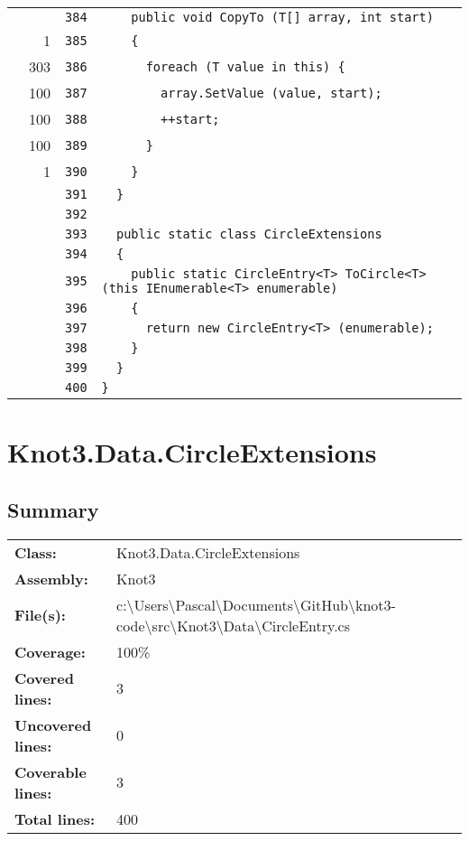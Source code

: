 \documentclass[a4paper,10pt]{article}
\begin{document}
\begin{longtable}[l]{lrrl}
\cellcolor{gray} &  & \verb~384~ & \verb~    public void CopyTo (T[] array, int start)~\\
\cellcolor{green} & 1 & \verb~385~ & \verb~    {~\\
\cellcolor{green} & 303 & \verb~386~ & \verb~      foreach (T value in this) {~\\
\cellcolor{green} & 100 & \verb~387~ & \verb~        array.SetValue (value, start);~\\
\cellcolor{green} & 100 & \verb~388~ & \verb~        ++start;~\\
\cellcolor{green} & 100 & \verb~389~ & \verb~      }~\\
\cellcolor{green} & 1 & \verb~390~ & \verb~    }~\\
\cellcolor{gray} &  & \verb~391~ & \verb~  }~\\
\cellcolor{gray} &  & \verb~392~ & \verb~~\\
\cellcolor{gray} &  & \verb~393~ & \verb~  public static class CircleExtensions~\\
\cellcolor{gray} &  & \verb~394~ & \verb~  {~\\
\cellcolor{gray} &  & \verb~395~ & \verb~    public static CircleEntry<T> ToCircle<T> (this IEnumerable<T> enumerable)~\\
\cellcolor{gray} &  & \verb~396~ & \verb~    {~\\
\cellcolor{gray} &  & \verb~397~ & \verb~      return new CircleEntry<T> (enumerable);~\\
\cellcolor{gray} &  & \verb~398~ & \verb~    }~\\
\cellcolor{gray} &  & \verb~399~ & \verb~  }~\\
\cellcolor{gray} &  & \verb~400~ & \verb~}~\\
\end{longtable}
\newpage
\section{Knot3.Data.CircleExtensions}
\subsection{Summary}
\begin{longtable}[l]{ll}
\textbf{Class:} & Knot3.Data.CircleExtensions\\
\textbf{Assembly:} & Knot3\\
\textbf{File(s):} & \begin{minipage}[t]{12cm}{c:\textbackslash Users\textbackslash Pascal\textbackslash Documents\textbackslash GitHub\textbackslash knot3-code\textbackslash src\textbackslash Knot3\textbackslash Data\textbackslash CircleEntry.cs}\end{minipage} \\
\textbf{Coverage:} & 100\%\\
\textbf{Covered lines:} & 3\\
\textbf{Uncovered lines:} & 0\\
\textbf{Coverable lines:} & 3\\
\textbf{Total lines:} & 400\\
\end{longtable}
\end{document}
